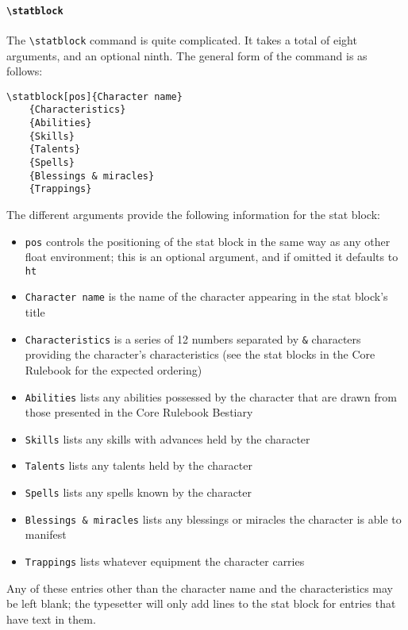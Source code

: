 \documentclass[10pt,a4paper]{article}
\begin{document}
\paragraph{\texttt{\textbackslash{}statblock}} The \texttt{\textbackslash{}statblock}
command is quite complicated. It takes a total of eight arguments, and an
optional ninth. The general form of the command is as follows:
\begin{verbatim}
\statblock[pos]{Character name}
    {Characteristics}
    {Abilities}
    {Skills}
    {Talents}
    {Spells}
    {Blessings & miracles}
    {Trappings}
\end{verbatim}
The different arguments provide the following information for the stat block:
\begin{itemize}
    \item \texttt{pos} controls the positioning of the stat block in the same
            way as any other float environment; this is an optional argument,
            and if omitted it defaults to \texttt{ht}
    \item \texttt{Character name} is the name of the character appearing in the
            stat block's title
    \item \texttt{Characteristics} is a series of 12 numbers separated by
            \texttt{\&} characters providing the character's characteristics
            (see the stat blocks in the Core Rulebook for the expected ordering)
    \item \texttt{Abilities} lists any abilities possessed by the character
            that are drawn from those presented in the Core Rulebook Bestiary
    \item \texttt{Skills} lists any skills with advances held by the character
    \item \texttt{Talents} lists any talents held by the character
    \item \texttt{Spells} lists any spells known by the character
    \item \texttt{Blessings \& miracles} lists any blessings or miracles the 
            character is able to manifest
    \item \texttt{Trappings} lists whatever equipment the character carries
\end{itemize}
Any of these entries other than the character name and the characteristics may
be left blank; the typesetter will only add lines to the stat block for entries
that have text in them.
\end{document}
